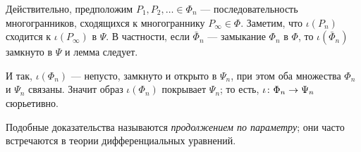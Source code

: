 \documentclass[oneside,a4paper]{article}
\begin{document}
Действительно, предположим $P_1,P_2,\dots\in \Phi_n$ --- последовательность многогранников, сходящихся к многограннику $P_\infty\in\Phi$.
Заметим, что $\iota(P_n)$ сходится к $\iota(P_\infty)$  в $\Psi$.
В частности, если $\bar \Phi_n$ --- замыкание $\Phi_n$ в $\Phi$,
то $\iota(\bar\Phi_n)$ замкнуто в $\Psi$ и лемма следует.

И так, $\iota(\Phi_n)$ --- непусто, замкнуто и открыто в $\Psi_n$, при этом оба множества $\Phi_n$ и $\Psi_n$ связаны.
Значит образ $\iota(\Phi_n)$ покрывает $\Psi_n$; то есть, $\iota\:\Phi_n\z\to\Psi_n$ сюрьетивно.
\qeds

Подобные доказательства называются \emph{продолжением по параметру};
они часто встречаются в теории дифференциальных уравнений.  

\sloppy
\printbibliography[heading=bibintoc]
\fussy
\end{document}
